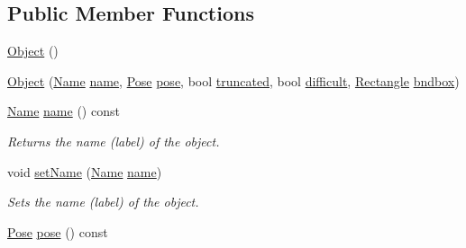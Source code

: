 \subsection*{Public Member Functions}
\begin{DoxyCompactItemize}
\item 
\hyperlink{class_f_f_l_d_1_1_object_a40860402e64d8008fb42329df7097cdb}{Object} ()
\item 
\hyperlink{class_f_f_l_d_1_1_object_a1078bdbbda7eec829d8f11717ea65970}{Object} (\hyperlink{class_f_f_l_d_1_1_object_a4db6ef6debc5011ab6da14f251fd3a32}{Name} \hyperlink{class_f_f_l_d_1_1_object_aa8b7117e7bec7bac930b7577a5dc528a}{name}, \hyperlink{class_f_f_l_d_1_1_object_a922b08e7fb8e69b9092b01eee82cd7ec}{Pose} \hyperlink{class_f_f_l_d_1_1_object_a370d8f00e19a2fedbf29c0f99804f1a1}{pose}, bool \hyperlink{class_f_f_l_d_1_1_object_aeb5fb9d9d6b975438b441d31230261e3}{truncated}, bool \hyperlink{class_f_f_l_d_1_1_object_a7316217057e6c76b57cd37b570d8c24f}{difficult}, \hyperlink{class_f_f_l_d_1_1_rectangle}{Rectangle} \hyperlink{class_f_f_l_d_1_1_object_a2dd49cdfad84ccaf0ef821438b5e8aa9}{bndbox})
\item 
\hypertarget{class_f_f_l_d_1_1_object_aa8b7117e7bec7bac930b7577a5dc528a}{\hyperlink{class_f_f_l_d_1_1_object_a4db6ef6debc5011ab6da14f251fd3a32}{Name} \hyperlink{class_f_f_l_d_1_1_object_aa8b7117e7bec7bac930b7577a5dc528a}{name} () const }\label{class_f_f_l_d_1_1_object_aa8b7117e7bec7bac930b7577a5dc528a}

\begin{DoxyCompactList}\small\item\em Returns the name (label) of the object. \end{DoxyCompactList}\item 
\hypertarget{class_f_f_l_d_1_1_object_a86018800797a71678aab85b62d865b1b}{void \hyperlink{class_f_f_l_d_1_1_object_a86018800797a71678aab85b62d865b1b}{set\-Name} (\hyperlink{class_f_f_l_d_1_1_object_a4db6ef6debc5011ab6da14f251fd3a32}{Name} \hyperlink{class_f_f_l_d_1_1_object_aa8b7117e7bec7bac930b7577a5dc528a}{name})}\label{class_f_f_l_d_1_1_object_a86018800797a71678aab85b62d865b1b}

\begin{DoxyCompactList}\small\item\em Sets the name (label) of the object. \end{DoxyCompactList}\item 
\hypertarget{class_f_f_l_d_1_1_object_a370d8f00e19a2fedbf29c0f99804f1a1}{\hyperlink{class_f_f_l_d_1_1_object_a922b08e7fb8e69b9092b01eee82cd7ec}{Pose} \hyperlink{class_f_f_l_d_1_1_object_a370d8f00e19a2fedbf29c0f99804f1a1}{pose} () const }\label{class_f_f_l_d_1_1_object_a370d8f00e19a2fedbf29c0f99804f1a1}


\end{DoxyCompactItemize}
